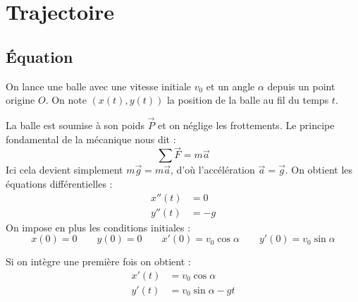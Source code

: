 \documentclass[11pt,class=report,crop=false]{standalone}
\begin{document}








\section{Trajectoire}

\subsection{Équation}

On lance une balle avec une vitesse initiale $v_0$ et un angle $\alpha$ depuis un point origine $O$.
On note $(x(t) , y(t))$ la position de la balle au fil du temps $t$.



La balle est soumise à son poids $\vec P$ et on néglige les frottements.
Le principe fondamental de la mécanique nous dit :
$$\sum \vec F = m \vec a$$ 
Ici cela devient simplement $m \vec g = m \vec a$, d'où l'accélération $\vec a = \vec g$.
On obtient les équations différentielles :
\begin{align*}
    x''(t) &= 0 \\
    y''(t) &= -g
\end{align*}
On impose en plus les conditions initiales :
$$
    x(0) = 0 \qquad
    y(0) = 0 \qquad
    x'(0) = v_0 \cos \alpha \qquad
    y'(0) = v_0 \sin \alpha
$$

Si on intègre une première fois on obtient :
\begin{align*}
    x'(t) &= v_0 \cos \alpha \\
    y'(t) &= v_0 \sin \alpha - g t
\end{align*}
\end{document}
